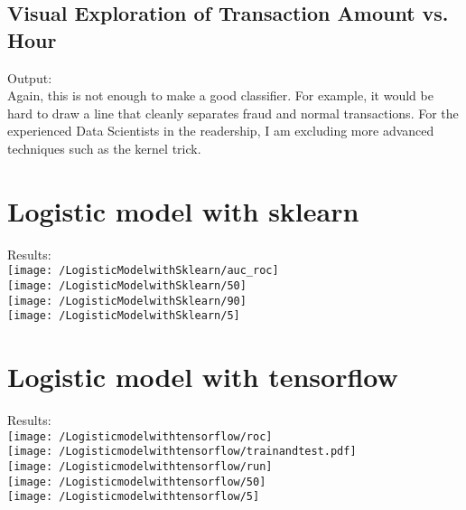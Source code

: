 \documentclass[17pt]{report}
\begin{document}
\subsection{Visual Exploration of Transaction Amount vs. Hour}

Output:\\
Again, this is not enough to make a good classifier. For example, it would be hard to draw a line that cleanly
separates fraud and normal transactions. For the experienced Data Scientists in the readership, I am excluding
more advanced techniques such as the kernel trick.\\
\section{Logistic model with sklearn}

Results:\\
\texttt{[image: /LogisticModelwithSklearn/auc\_roc]}\\
\texttt{[image: /LogisticModelwithSklearn/50]}\\
\texttt{[image: /LogisticModelwithSklearn/90]}\\
\texttt{[image: /LogisticModelwithSklearn/5]}
\section{Logistic model with tensorflow}

Results:\\
\texttt{[image: /Logisticmodelwithtensorflow/roc]}\\
\texttt{[image: /Logisticmodelwithtensorflow/trainandtest.pdf]}\\
\texttt{[image: /Logisticmodelwithtensorflow/run]}\\
\texttt{[image: /Logisticmodelwithtensorflow/50]}\\
\texttt{[image: /Logisticmodelwithtensorflow/5]}
\end{document}
